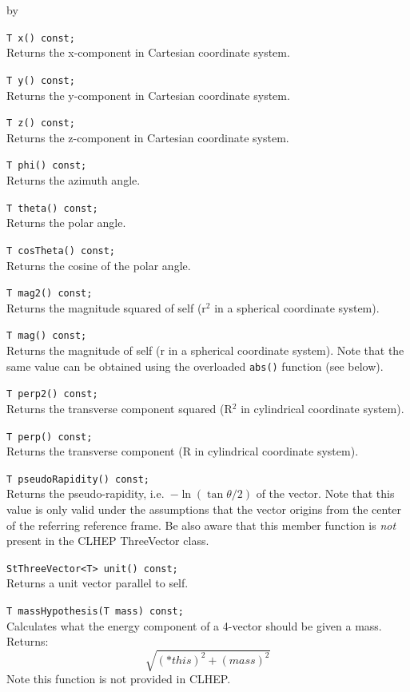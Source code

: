 \documentclass[twoside]{article}
\newcommand{\comp}[1]{\texttt{#1}}%
\newcommand{\entrylabel}[1]{\mbox{\textbf{{#1}}}\hfil}%
\newenvironment{entry}
{\begin{list}{}%
    {\renewcommand{\makelabel}{\entrylabel}%
     \setlength{\labelwidth}{90pt}%
     \setlength{\leftmargin}{\labelwidth}
     \advance\leftmargin by \labelsep%
      }%
    }%
  {\end{list}}
\newcommand{\Entrylabel}[1]%
{\raisebox{0pt}[1ex][0pt]{\makebox[\labelwidth][l]%
    {\parbox[t]{\labelwidth}{\hspace{0pt}\textbf{{#1}}}}}}
\newenvironment{Entry}%
{\renewcommand{\entrylabel}{\Entrylabel}\begin{entry}}%
  {\end{entry}}
\begin{document}
\begin{description}
\begin{Entry}
    \verb+T x() const;+\\
    Returns the x-component in Cartesian coordinate system.
    
    \verb+T y() const;+\\
    Returns the y-component in Cartesian coordinate system.
    
    \verb+T z() const;+\\
    Returns the z-component in Cartesian coordinate system.
    
    \verb+T phi() const;+\\
    Returns the azimuth angle.
    
    \verb+T theta() const;+\\
    Returns the polar angle.
    
    \verb+T cosTheta() const;+\\
    Returns the cosine of the polar angle.
    
    \verb+T mag2() const;+\\
    Returns the magnitude squared of self (r$^2$ in a spherical coordinate system).
    
    \verb+T mag() const;+\\
    Returns the magnitude of self (r in a spherical coordinate system).
    Note that the same value can be obtained using the overloaded
    \comp{abs()} function (see below). 
    
    \verb+T perp2() const;+\\
    Returns the transverse component squared
    (R$^2$ in cylindrical coordinate system).
    
    \verb+T perp() const;+\\
    Returns the transverse component
    (R in cylindrical coordinate system). 
    
    \verb+T pseudoRapidity() const;+\\
    Returns the pseudo-rapidity, i.e.~$-\ln(\tan \theta/2)$ of the
    vector. Note that this value is only valid under the assumptions
    that the vector origins from the center of the referring
    reference frame. Be also aware that this member function is
    {\em not} present in the CLHEP ThreeVector class.
    
    \verb+StThreeVector<T> unit() const;+\\
    Returns a unit vector parallel to self.

    \verb+T massHypothesis(T mass) const;+\\
    Calculates what the energy component of a 4-vector
    should be given a mass.  Returns:
    \begin{equation*}
      \sqrt{(*this)^{2} + (mass)^{2}}
    \end{equation*}
    Note this function is not provided in CLHEP.
    

\end{Entry}
\end{description}
\end{document}
